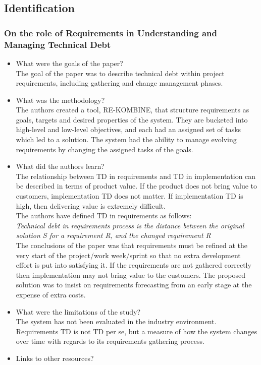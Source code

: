 \documentclass{mprop}
\begin{document}
\subsection{Identification}

\subsubsection{On the role of Requirements in Understanding and Managing Technical Debt} \cite{Ernst2012}
\begin{itemize}
	\item What were the goals of the paper? \\
	      The goal of the paper was to describe technical debt within project requirements, including gathering and change management phases.
	\item What was the methodology? \\
	      The authors created a tool, RE-KOMBINE, that structure requirements as goals, targets and desired properties of the system.
	      They are bucketed into high-level and low-level objectives, and each had an assigned set of tasks which led to a solution.
	      The system had the ability to manage evolving requirements by changing the assigned tasks of the goals.
	\item What did the authors learn?\\
	      The relationship between TD in requirements and TD in implementation can be described in terms of product value.
	      If the product does not bring value to customers, implementation TD does not matter.
	      If implementation TD is high, then delivering value is extremely difficult.\\
	      The authors have defined TD in requirements as follows:\\
	      \textit{Technical debt in requirements process is the distance between the original solution S for a requirement R, and the changed requirement R} \\
	      The conclusions of the paper was that requirements must be refined at the very start of the project/work week/sprint so that no extra development effort is put into satisfying it.
	      If the requirements are not gathered correctly then implementation may not bring value to the customers.
	      The proposed solution was to insist on requirements forecasting from an early stage at the expense of extra costs.
	\item What were the limitations of the study?\\
	      The system has not been evaluated in the industry environment.\\
	      Requirements TD is not TD per se, but a measure of how the system changes over time with regards to its requirements gathering process.
	\item Links to other resources? \\
\end{itemize}
\end{document}
